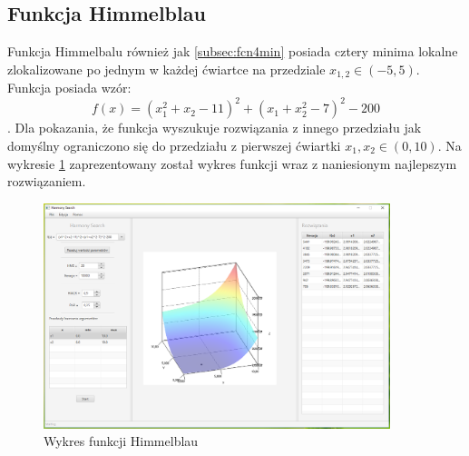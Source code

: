 \documentclass[10pt, a4paper]{article}
\begin{document}
\subsection{Funkcja Himmelblau}
\label{subsec:himmelblau}
Funkcja Himmelbalu również jak \ref{subsec:fcn4min} posiada cztery minima lokalne zlokalizowane po jednym w każdej ćwiartce na przedziale $x_{1,2} \in (-5,5)$. Funkcja posiada wzór: $$ f(x) = (x_{1}^{2}+x_{2}-11)^{2}+(x_{1}+x_{2}^{2}-7)^{2}-200$$. Dla pokazania, że funkcja wyszukuje rozwiązania z innego przedziału jak domyślny ograniczono się do przedziału z pierwszej ćwiartki $x_{1}, x_{2} \in (0,10)$. Na wykresie \ref{fig:5} zaprezentowany został wykres funkcji wraz z naniesionym najlepszym rozwiązaniem. 
\begin{figure}[htbp]
	\centering
	\includegraphics[width=0.90\textwidth]{images/4.PNG}
	\caption{Wykres funkcji Himmelblau}
	\label{fig:5}
\end{figure}
\end{document}
